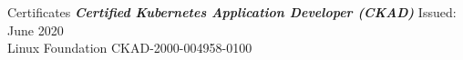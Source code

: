 \begin{section}{Certificates}
    {\sl \textbf{Certified Kubernetes Application Developer (CKAD)}} \hfill Issued: June 2020\\
    Linux Foundation \hfill CKAD-2000-004958-0100 \\
\end{section}